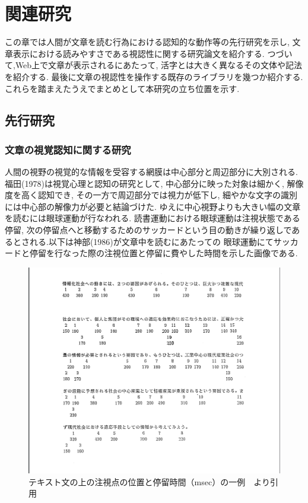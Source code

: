 \chapter{関連研究}
\label{chap:system}

この章では人間が文章を読む行為における認知的な動作等の先行研究を示し,
文章表示における読みやすさである視認性に関する研究論文を紹介する.
つづいて,Web上で文章が表示されるにあたって, 活字とは大きく異なるその文体や記法を紹介する.
最後に文章の視認性を操作する既存のライブラリを幾つか紹介する.
これらを踏まえたうえでまとめとして本研究の立ち位置を示す.

\newpage

\section{先行研究}

\subsection{文章の視覚認知に関する研究}
人間の視野の視覚的な情報を受容する網膜は中心部分と周辺部分に大別される.
福田(1978)は視覚心理と認知の研究として, 中心部分に映った対象は細かく, 解像度を高く認知でき, 
その一方で周辺部分では視力が低下し, 細やかな文字の識別には中心部の解像力が必要と結論づけた.\cite{福田78} 
ゆえに中心視野よりも大きい幅の文章を読むには眼球運動が行なわれる.
読書運動における眼球運動は注視状態である停留, 
次の停留点へと移動するためのサッカードという目の動きが繰り返しであるとされる.以下は神部(1986)が文章中を読むにあたっての
眼球運動にてサッカードと停留を行なった際の注視位置と停留に費やした時間を示した画像である.\cite{神部86}

\begin{figure}[H]
    \centering
    \label{fig:saccade}
    \includegraphics[width=0.6\columnwidth]{image/02/saccade.png}
    \caption[テキスト文の上の注視点の位置と停留時間（msec）の一例]
     {テキスト文の上の注視点の位置と停留時間（msec）の一例　\protect\cite{神部86}より引用}

\end{figure}

